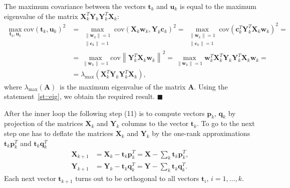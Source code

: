 \documentclass[12pt,twoside]{article}
\begin{document}
The maximum covariance between the vectors $\mathbf{t}_k$ and $\mathbf{u}_k$ is equal to the maximum eigenvalue of the matrix $\mathbf{X}_k^{T} \mathbf{Y}_k \mathbf{Y}_k^{T} \mathbf{X}_k$:
\begin{align*}
\max_{\mathbf{t}_k, \mathbf{u}_k}  \text{cov} (\mathbf{t}_k, \mathbf{u}_k)^2 &= \max_{\substack{\|\mathbf{w}_k\|=1 \\ \|\mathbf{c}_k\| = 1}} \text{cov} \left( \mathbf{X}_k \mathbf{w}_k, \mathbf{Y}_k \mathbf{c}_k \right)^2 = \max_{\substack{\|\mathbf{w}_k\|=1 \\ \|\mathbf{c}_k\| = 1}} \text{cov} \left(\mathbf{c}_k^{T}  \mathbf{Y}_k^{T} \mathbf{X}_k \mathbf{w}_k \right)^2 = \\
&= \max_{\|\mathbf{w}_k\| = 1} \text{cov} \left\|\mathbf{Y}_k^{T} \mathbf{X}_k \mathbf{w}_k \right\|^2 = \max_{\|\mathbf{w}_k\| = 1} \mathbf{w}_k^{T} \mathbf{X}_k^{T} \mathbf{Y}_k \mathbf{Y}_k^{T} \mathbf{X}_k \mathbf{w}_k = \\
& = \lambda_{\max} \left( \mathbf{X}_k^{T} \mathbf{Y}_k \mathbf{Y}_k^{T} \mathbf{X}_k \right),
\end{align*}
where $ \lambda_{\max} (\mathbf{A})$~is the maximum eigenvalue of the matrix $\mathbf{A}$.
Using the statement~\ref{st::eig}, we obtain the required result.
$\blacksquare$

After the inner loop the following step (11) is to compute vectors $\mathbf{p}_k$, $\mathbf{q}_k$ by projection of the matrices $\mathbf{X}_k$ and $\mathbf{Y}_k$ columns to the vector $\mathbf{t}_k$. 
To go to the next step one has to deflate the matrices $\mathbf{X}_k$ and $\mathbf{Y}_k$ by the one-rank approximations $\mathbf{t}_k \mathbf{p}_k^{T}$ and $\mathbf{t}_k \mathbf{q}_k^{T}$
\begin{align*}
    \mathbf{X}_{k + 1} &= \mathbf{X}_{k} - \mathbf{t}_k \mathbf{p}_k^{T} = \mathbf{X} - \sum_k \mathbf{t}_k \mathbf{p}_k^{T}, \\
    \mathbf{Y}_{k + 1} &= \mathbf{Y}_{k} - \mathbf{t}_k \mathbf{q}_k^{T} = \mathbf{Y} - \sum_k \mathbf{t}_k \mathbf{q}_k^{T}.
\end{align*}
Each next vector $\mathbf{t}_{k+1}$ turns out to be orthogonal to all vectors $\mathbf{t}_i$, $i=1, \dots, k$.
\end{document}
